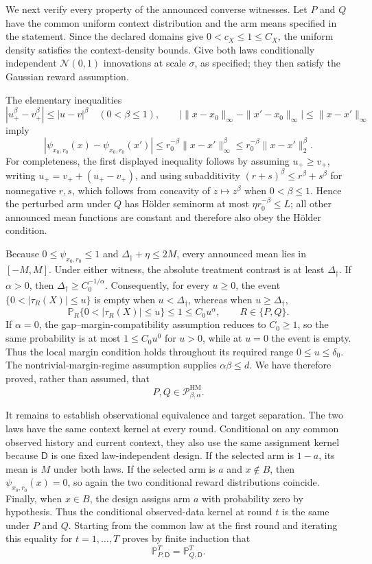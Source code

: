 We next verify every property of the announced converse witnesses.  Let \(P\) and \(Q\) have the common uniform context distribution and the arm means specified in the statement.  Since the declared domains give \(0<c_X\le 1\le C_X\), the uniform density satisfies the context-density bounds.  Give both laws conditionally independent \(\mathcal N(0,1)\) innovations at scale \(\sigma\), as specified; they then satisfy the Gaussian reward assumption.

The elementary inequalities
\[
|u_+^\beta-v_+^\beta|\le |u-v|^\beta
\quad(0<\beta\le1),
\qquad
\bigl|\|x-x_0\|_\infty-\|x'-x_0\|_\infty\bigr|
\le\|x-x'\|_\infty
\]
imply
\[
|\psi_{x_0,r_0}(x)-\psi_{x_0,r_0}(x')|
\le r_0^{-\beta}\|x-x'\|_\infty^\beta
\le r_0^{-\beta}\|x-x'\|_2^\beta.
\]
For completeness, the first displayed inequality follows by assuming \(u_+\ge v_+\), writing \(u_+=v_++(u_+-v_+)\), and using subadditivity
\((r+s)^\beta\le r^\beta+s^\beta\) for nonnegative \(r,s\), which follows from concavity of \(z\mapsto z^\beta\) when \(0<\beta\le1\).  Hence the perturbed arm under \(Q\) has Hölder seminorm at most \(\eta r_0^{-\beta}\le L\); all other announced mean functions are constant and therefore also obey the Hölder condition.

Because \(0\le\psi_{x_0,r_0}\le1\) and \(\Delta_\dagger+\eta\le2M\), every announced mean lies in \([-M,M]\).  Under either witness, the absolute treatment contrast is at least \(\Delta_\dagger\).  If \(\alpha>0\), then \(\Delta_\dagger\ge C_0^{-1/\alpha}\).  Consequently, for every \(u\ge0\), the event
\(\{0<|\tau_R(X)|\le u\}\) is empty when \(u<\Delta_\dagger\), whereas when \(u\ge\Delta_\dagger\),
\[
\mathbb P_R\{0<|\tau_R(X)|\le u\}
\le1\le C_0u^\alpha,
\qquad R\in\{P,Q\}.
\]
If \(\alpha=0\), the gap--margin-compatibility assumption reduces to \(C_0\ge1\), so the same probability is at most \(1\le C_0u^0\) for \(u>0\), while at \(u=0\) the event is empty.  Thus the local margin condition holds throughout its required range \(0\le u\le\delta_0\).  The nontrivial-margin-regime assumption supplies \(\alpha\beta\le d\).  We have therefore proved, rather than assumed, that
\[
P,Q\in\mathcal P_{\beta,\alpha}^{\mathrm{HM}}.
\]

It remains to establish observational equivalence and target separation.  The two laws have the same context kernel at every round.  Conditional on any common observed history and current context, they also use the same assignment kernel because \(\mathsf D\) is one fixed law-independent design.  If the selected arm is \(1-a\), its mean is \(M\) under both laws.  If the selected arm is \(a\) and \(x\notin B\), then
\(\psi_{x_0,r_0}(x)=0\), so again the two conditional reward distributions coincide.  Finally, when \(x\in B\), the design assigns arm \(a\) with probability zero by hypothesis.  Thus the conditional observed-data kernel at round \(t\) is the same under \(P\) and \(Q\).  Starting from the common law at the first round and iterating this equality for \(t=1,\ldots,T\) proves by finite induction that
\[
\mathbb P_{P,\mathsf D}^{T}=\mathbb P_{Q,\mathsf D}^{T}.
\]

